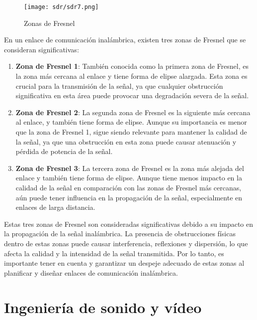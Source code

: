 \documentclass[
	12pt, %
	fleqn, %
	a4paper, %
	oneside, %
]{LegrandOrangeBook}
\begin{document}
\begin{figure}[H]
\centering
\texttt{[image: sdr/sdr7.png]}
\caption{Zonas de Fresnel}
\end{figure}
En un enlace de comunicación inalámbrica, existen tres zonas de Fresnel que se consideran significativas:
\begin{enumerate}
\item \textbf{Zona de Fresnel 1}: También conocida como la primera zona de Fresnel, es la zona más cercana al enlace y tiene forma de elipse alargada. Esta zona es crucial para la transmisión de la señal, ya que cualquier obstrucción significativa en esta área puede provocar una degradación severa de la señal.
\item \textbf{Zona de Fresnel 2}: La segunda zona de Fresnel es la siguiente más cercana al enlace, y también tiene forma de elipse. Aunque su importancia es menor que la zona de Fresnel 1, sigue siendo relevante para mantener la calidad de la señal, ya que una obstrucción en esta zona puede causar atenuación y pérdida de potencia de la señal.
\item \textbf{Zona de Fresnel 3}: La tercera zona de Fresnel es la zona más alejada del enlace y también tiene forma de elipse. Aunque tiene menos impacto en la calidad de la señal en comparación con las zonas de Fresnel más cercanas, aún puede tener influencia en la propagación de la señal, especialmente en enlaces de larga distancia.
\end{enumerate}
Estas tres zonas de Fresnel son consideradas significativas debido a su impacto en la propagación de la señal inalámbrica. La presencia de obstrucciones físicas dentro de estas zonas puede causar interferencia, reflexiones y dispersión, lo que afecta la calidad y la intensidad de la señal transmitida. Por lo tanto, es importante tener en cuenta y garantizar un despeje adecuado de estas zonas al planificar y diseñar enlaces de comunicación inalámbrica.


\part{Ingeniería de sonido y vídeo}
\end{document}

